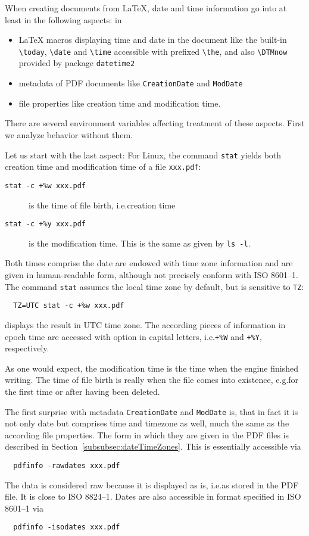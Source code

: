 \documentclass[a4paper, english]{article}%
\newcommand{\cmd}[1]{\texttt{\textbackslash#1}}
\begin{document}
When creating documents from \LaTeX, 
date and time information go into at least in the following aspects: in 
%
\begin{itemize}
\item 
\LaTeX{} macros displaying time and date in the document 
like the built-in \cmd{today}, \cmd{date} and \cmd{time} 
accessible with prefixed \cmd{the}, 
and also \cmd{DTMnow} provided by package \texttt{datetime2} 
\item 
metadata of PDF documents like \texttt{CreationDate} 
and \texttt{ModDate}
\item 
file properties like creation time and modification time. 
\end{itemize}

There are several environment variables affecting treatment of these aspects. 
First we analyze behavior without them. 

Let us start with the last aspect: 
For Linux, the command \texttt{stat} 
yields both creation time and modification time of a file \texttt{xxx.pdf}: 
%
\begin{description}
  \item[\texttt{stat -c +\%w xxx.pdf}] is the time of file birth, i.e.\@ creation time 
  \item[\texttt{stat -c +\%y xxx.pdf}] is the modification time. 
  This is the same as given by \texttt{ls -l}. 
\end{description}
%
Both times comprise the date 
are endowed with time zone information and are given in human-readable form, 
although not precisely conform with ISO 8601--1. 
The command \texttt{stat} assumes the local time zone by default, 
but is sensitive to \texttt{TZ}: 
%
\begin{verbatim}
  TZ=UTC stat -c +%w xxx.pdf
\end{verbatim}
%
displays the result in UTC time zone. 
The according pieces of information in epoch time 
are accessed with option in capital letters, 
i.e.\@ \texttt{+\%W} and \texttt{+\%Y}, respectively. 
\medskip


As one would expect, the modification time is the time when the engine finished writing. 
The time of file birth is really when the file comes into existence, 
e.g.\@ for the first time or after having been deleted. 

The first surprise with metadata \texttt{CreationDate} and \texttt{ModDate} is, 
that in fact it is not only date but comprises time and timezone as well, 
much the same as the according file properties. 
The form in which they are given in the PDF files 
is described in Section~\ref{subsubsec:dateTimeZones}. 
This is essentially accessible via 
%
\begin{verbatim}
  pdfinfo -rawdates xxx.pdf
\end{verbatim}
%
The data is considered raw because it is displayed as is, i.e.\@ as stored in the PDF file. 
It is close to ISO 8824--1. 
Dates are also accessible in format specified in ISO 8601--1 via 
%
\begin{verbatim}
  pdfinfo -isodates xxx.pdf
\end{verbatim}
\end{document}
